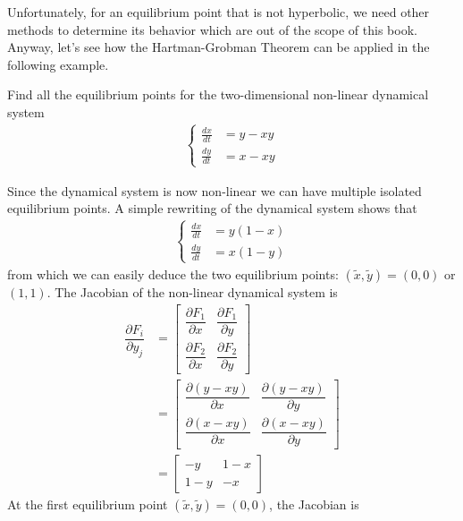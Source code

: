 Unfortunately, for an equilibrium point that is not hyperbolic, we need other methods to determine its behavior which are out of the scope of this book. Anyway, let's see how the Hartman-Grobman Theorem can be applied in the following example.
\begin{exmp}
\label{exmp:nonlindynsaddlenode}
Find all the equilibrium points for the two-dimensional non-linear dynamical system
\begin{align*}
\left\{
\begin{aligned}
\frac{dx}{dt} &= y - xy \\
\frac{dy}{dt} &= x - xy
\end{aligned}
\right.
\end{align*}
\end{exmp}
\begin{solution}
Since the dynamical system is now non-linear we can have multiple isolated equilibrium points. A simple rewriting of the dynamical system shows that
\begin{align*}
\left\{
\begin{aligned}
\frac{dx}{dt} &= y (1-x) \\
\frac{dy}{dt} &= x (1-y)
\end{aligned}
\right.
\end{align*}
from which we can easily deduce the two equilibrium points: $(\tilde{x}, \tilde{y}) = (0,0)$ or $(1,1)$. The Jacobian of the non-linear dynamical system is
\begin{align*}
\dfrac{\partial F_i}{\partial y_j} &= 
\begin{bmatrix}
\dfrac{\partial F_1}{\partial x} & \dfrac{\partial F_1}{\partial y} \\
\dfrac{\partial F_2}{\partial x} & \dfrac{\partial F_2}{\partial y}
\end{bmatrix} \\
&= 
\begin{bmatrix}
\dfrac{\partial (y-xy)}{\partial x} & \dfrac{\partial (y-xy)}{\partial y} \\
\dfrac{\partial (x-xy)}{\partial x} & \dfrac{\partial (x-xy)}{\partial y}
\end{bmatrix} \\
&= 
\begin{bmatrix}
-y & 1-x \\
1-y & -x
\end{bmatrix}
\end{align*}
At the first equilibrium point $(\tilde{x}, \tilde{y}) = (0,0)$, the Jacobian is
\begin{align*}

\end{align*}
\end{solution}
